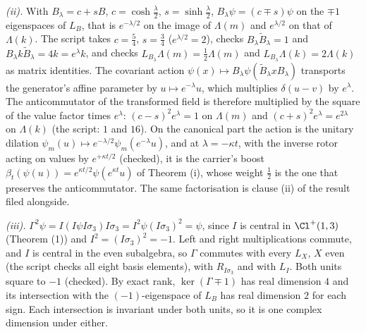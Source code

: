 \emph{(ii).} With $B_{\lambda} = c + sB$, $c = \cosh\tfrac{\lambda}{2}$, $s = \sinh\tfrac{\lambda}{2}$, $B_{\lambda}\psi = (c \mp s)\psi$ on the $\mp1$ eigenspaces of $L_{B}$, that is $e^{-\lambda/2}$ on the image of $\Lambda(m)$ and $e^{\lambda/2}$ on that of $\Lambda(k)$. The script takes $c = \tfrac54$, $s = \tfrac34$ ($e^{\lambda/2} = 2$), checks $B_{\lambda}\tilde{B}_{\lambda} = 1$ and $B_{\lambda}k\tilde{B}_{\lambda} = 4k = e^{\lambda}k$, and checks $L_{B_{\lambda}}\Lambda(m) = \tfrac12\Lambda(m)$ and $L_{B_{\lambda}}\Lambda(k) = 2\Lambda(k)$ as matrix identities. The covariant action $\psi(x) \mapsto B_{\lambda}\psi(\tilde{B}_{\lambda}xB_{\lambda})$ transports the generator's affine parameter by $u \mapsto e^{-\lambda}u$, which multiplies $\delta(u - v)$ by $e^{\lambda}$. The anticommutator of the transformed field is therefore multiplied by the square of the value factor times $e^{\lambda}$: $(c - s)^{2}e^{\lambda} = 1$ on $\Lambda(m)$ and $(c + s)^{2}e^{\lambda} = e^{2\lambda}$ on $\Lambda(k)$ (the script: $1$ and $16$). On the canonical part the action is the unitary dilation $\psi_{m}(u) \mapsto e^{-\lambda/2}\psi_{m}(e^{-\lambda}u)$, and at $\lambda = -\kappa t$, with the inverse rotor acting on values by $e^{+\kappa t/2}$ (checked), it is the carrier's boost $\beta_{t}(\psi(u)) = e^{\kappa t/2}\psi(e^{\kappa t}u)$ of Theorem (i), whose weight $\tfrac12$ is the one that preserves the anticommutator. The same factorisation is clause (ii) of the result filed alongside.

\emph{(iii).} $\Gamma^{2}\psi = I(I\psi I\sigma_{3})I\sigma_{3} = I^{2}\psi(I\sigma_{3})^{2} = \psi$, since $I$ is central in $\Cl^{+}(1,3)$ (Theorem (1)) and $I^{2} = (I\sigma_{3})^{2} = -1$. Left and right multiplications commute, and $I$ is central in the even subalgebra, so $\Gamma$ commutes with every $L_{X}$, $X$ even (the script checks all eight basis elements), with $R_{I\sigma_{3}}$ and with $L_{I}$. Both units square to $-1$ (checked). By exact rank, $\ker(\Gamma \mp 1)$ has real dimension $4$ and its intersection with the $(-1)$-eigenspace of $L_{B}$ has real dimension $2$ for each sign. Each intersection is invariant under both units, so it is one complex dimension under either.

